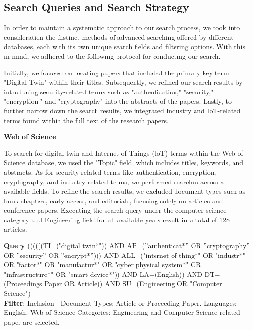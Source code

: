\subsection{Search Queries and Search Strategy}
In order to maintain a systematic approach to our search process, we took into consideration the distinct methods of advanced searching offered by different databases, each with its own unique search fields and filtering options. With this in mind, we adhered to the following protocol for conducting our search.
 
Initially, we focused on locating papers that included the primary key term "Digital Twin" within their titles. Subsequently, we refined our search results by introducing security-related terms such as "authentication," "security," "encryption," and "cryptography" into the abstracts of the papers. Lastly, to further narrow down the search results, we integrated industry and IoT-related terms found within the full text of the research papers. 




\textbf{Web of Science}

To search for digital twin and Internet of Things (IoT) terms within the Web of Science database, we used the "Topic" field, which includes titles, keywords, and abstracts. As for security-related terms like authentication, encryption, cryptography, and industry-related terms, we performed searches across all available fields. To refine the search results, we excluded document types such as book chapters, early access, and editorials, focusing solely on articles and conference papers. Executing the search query under the computer science category and Engineering field for all available years result in a total of 128 articles. 

\begin{tcolorbox}[colback=black!5!white, sharp corners=all, colframe=white!95!black]
\textbf{Query}
\tcblower
((((((TI=("digital twin*")) AND AB=(”authenticat*” OR ”cryptography” OR ”security” OR ”encrypt*”))) AND ALL=("internet of thing*" OR "industr*"  OR  "factor*"  OR  "manufactur*"  OR  "cyber physical system*"  OR  "infrastructure*" OR "smart device*")) AND LA=(English)) AND DT=(Proceedings Paper OR Article)) AND SU=(Engineering OR "Computer Science")  \\


\textbf{Filter}: Inclusion - Document Types: Article or Proceeding Paper. Languages: English. Web of Science Categories: Engineering and Computer Science  related paper are selected.

\end{tcolorbox}


